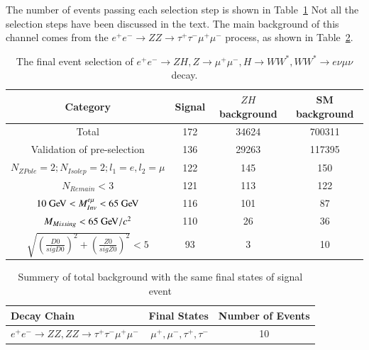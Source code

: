 \documentclass[11pt,a4paper]{cepcnote}
\begin{document}
The number of events passing each selection step is shown in 
Table~\ref{tab:emu} {\color{red} Not all the selection steps have been discussed in the text}. The main background of this channel comes from
the  $e^+e^-\rightarrow  ZZ\rightarrow\tau^+\tau^-\mu^+\mu^- $ process, 
as shown in Table~\ref{tab:uueubkg}.
\begin{table}[H]
\begin{center}
\begin{tabular}{cccc}
\hline \hline
\multicolumn{1}{c}{Category} & \multicolumn{1}{c}{Signal}&\multicolumn{1}{c}{$ZH$ background}&\multicolumn{1}{c}{SM background}\\   
\hline
  Total                                                 &     172   & 34624 &700311\\
  Validation of pre-selection				            &     136   & 29263 & 117395\\
  $N_{ZPole}=2; N_{Isolep}=2; l_1 = e, l_2 = \mu$       &     122   &   145 &   150  \\
  $N_{Remain} < 3$                                      &     121   &   113 &   122   \\
  $10\gev < M_{Inv}^{e\mu} < 65\gev$                    &     116   &   101 &   87  \\
  $M_{Missing} < 65\gev/c^2$                      		&     110   &   26  &   36   \\
  $\sqrt{(\frac{D0}{sigD0})^2+(\frac{Z0}{sigZ0})^2} < 5$&     93    &   3   &   10   \\
  \hline \hline
  \end{tabular}
  \caption[Monte Carlo purities in the single lepton sample]{%
	  The final event selection of $e^+e^-\rightarrow ZH, Z\rightarrow\mu^+\mu^-, H\rightarrow WW^*, WW^*\rightarrow e\nu\mu\nu$ decay.}
\label{tab:emu}
\end{center}
\end{table}
\begin{table}[H]
\begin{center}
\begin{tabular}{lrc}
\hline\hline
Decay Chain	& Final States 	&	Number of Events\\
\hline
$e^+e^-\rightarrow ZZ, ZZ\rightarrow\tau^+\tau^-\mu^+\mu^- $	& $\mu^+, \mu^-, \tau^+, \tau^-$			&10	\\
\hline\hline
\end{tabular}
\caption{Summery of total background with the same final states of signal event}
\label{tab:uueubkg}
\end{center}
\end{table}
\end{document}
